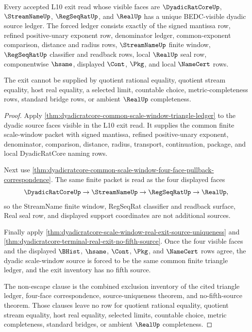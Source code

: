 \begin{theorem}
\label{thm:dyadicratcore-streamname-regseqrat-real-l10-exit-ledger}
Every accepted L10 exit read whose visible faces are $\DyadicRatCoreUp$, $\StreamNameUp$, $\RegSeqRatUp$, and $\RealUp$ has a unique BEDC-visible dyadic source ledger. The forced ledger consists exactly of the signed mantissa row, refined positive-unary exponent row, denominator ledger, common-exponent comparison, distance and radius rows, $\StreamNameUp$ finite window, $\RegSeqRatUp$ classifier and readback rows, local $\RealUp$ seal row, componentwise $\hsame$, displayed $\Cont$, $\Pkg$, and local $\NameCert$ rows.

The exit cannot be supplied by quotient rational equality, quotient stream equality, host real equality, a selected limit, countable choice, metric-completeness rows, standard bridge rows, or ambient $\RealUp$ completeness.
\end{theorem}
\begin{proof}
Apply \autoref{thm:dyadicratcore-common-scale-window-triangle-ledger} to the dyadic source faces visible in the L10 exit read. It supplies the common finite scale-window packet with signed mantissa, refined positive-unary exponent, denominator, comparison, distance, radius, transport, continuation, package, and local DyadicRatCore naming rows.

Next use \autoref{thm:dyadicratcore-common-scale-window-four-face-pullback-correspondence}. The same finite packet is read as the four displayed faces
$$
\DyadicRatCoreUp \to \StreamNameUp \to \RegSeqRatUp \to \RealUp ,
$$
so the StreamName finite window, RegSeqRat classifier and readback surface, Real seal row, and displayed support coordinates are not additional sources.

Finally apply \autoref{thm:dyadicratcore-scale-window-real-exit-source-uniqueness} and \autoref{thm:dyadicratcore-terminal-real-exit-no-fifth-source}. Once the four visible faces and the displayed $\BHist$, $\hsame$, $\Cont$, $\Pkg$, and $\NameCert$ rows agree, the dyadic scale-window source is forced to be the same common finite triangle ledger, and the exit inventory has no fifth source.

The non-escape clause is the combined exclusion inventory of the cited triangle ledger, four-face correspondence, source-uniqueness theorem, and no-fifth-source theorem. Those clauses leave no row for quotient rational equality, quotient stream equality, host real equality, selected limits, countable choice, metric completeness, standard bridges, or ambient $\RealUp$ completeness.
\end{proof}

